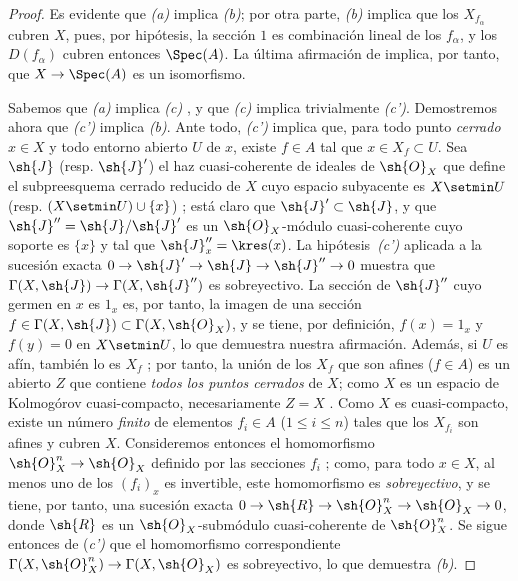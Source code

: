 \documentclass[oneside,10pt]{amsart}
\makeatletter
\renewcommand{\leq}{\leqslant}
\newcommand{\ega@arrow}[2]{\mathchoice{#1}{#2}{#2}{#2}}
\renewcommand{\to}{\ega@arrow{\longrightarrow}{\rightarrow}}
\newcommand{\oldpage}[2][]{\marginnote{\normalfont\footnotesize\textbf{#1}~|~#2}\ignorespaces}
\makeatother
\begin{document}
\begin{proof}
Es evidente que \emph{(a)} implica \emph{(b)};
por otra parte, \emph{(b)} implica que los $X_{f_\alpha}$ cubren $X$, pues, por hipótesis, la sección $1$ es combinación lineal de los $f_\alpha$, y los $D(f_\alpha)$ cubren entonces $\Spec(A)$.
La última afirmación de  implica, por tanto, que $X\to\Spec(A)$ es un isomorfismo.

Sabemos que \emph{(a)} implica \emph{(c)} , y que \emph{(c)} implica trivialmente \emph{(c')}.
Demostremos ahora que \emph{(c')} implica \emph{(b)}.
Ante todo, \emph{(c')} implica que, para todo punto \emph{cerrado} $x\in X$ y todo entorno abierto $U$ de $x$, existe $f\in A$ tal que $x\in X_f\subset U$.
Sea $\sh{J}$ (resp. $\sh{J}'$) el haz cuasi-coherente de ideales de $\sh{O}_X$ que define el subpreesquema cerrado reducido de $X$ cuyo espacio subyacente es $X\setmin U$ (resp. $(X\setmin U)\cup\{x\}$) ;
está claro que $\sh{J}'\subset\sh{J}$, y que $\sh{J}''=\sh{J}/\sh{J}'$ es un $\sh{O}_X$-módulo cuasi-coherente cuyo soporte es $\{x\}$ y tal que $\sh{J}_x''=\kres(x)$.
La hipótesis~\emph{(c')} aplicada a la sucesión exacta $0\to\sh{J}'\to\sh{J}\to\sh{J}''\to0$ muestra que $\Gamma(X,\sh{J})\to\Gamma(X,\sh{J}'')$ es sobreyectivo.
La sección de $\sh{J}''$ cuyo germen en $x$ es $1_x$ es, por tanto, la imagen de una sección $f\in\Gamma(X,\sh{J})\subset\Gamma(X,\sh{O}_X)$, y se tiene, por definición, $f(x)=1_x$ y $f(y)=0$ en $X\setmin U$, lo que demuestra nuestra afirmación.
Además, si $U$ es afín, también lo es $X_f$ ; por tanto, la unión de los $X_f$ que son afines ($f\in A$) es un abierto $Z$ que contiene \emph{todos los puntos cerrados} de $X$;
como $X$ es un espacio de Kolmogórov cuasi-compacto, necesariamente $Z=X$ .
Como $X$ es cuasi-compacto, existe un número \emph{finito} de elementos $f_i\in A$ ($1\leq i\leq n$) tales que los $X_{f_i}$ son afines y cubren $X$.
Consideremos entonces el homomorfismo $\sh{O}_X^n\to\sh{O}_X$ definido por las secciones $f_i$ ;
como, para todo $x\in X$, al menos uno de los $(f_i)_x$ es invertible, este homomorfismo es \emph{sobreyectivo}, y se tiene, por tanto, una sucesión exacta $0\to\sh{R}\to\sh{O}_X^n\to\sh{O}_X\to0$, donde $\sh{R}$ es un $\sh{O}_X$-submódulo cuasi-coherente de $\sh{O}_X^n$.
Se sigue entonces
\oldpage[II]{98}
de (\emph{c')} que el homomorfismo correspondiente $\Gamma(X,\sh{O}_X^n)\to\Gamma(X,\sh{O}_X)$ es sobreyectivo, lo que demuestra \emph{(b)}.


\end{proof}
\end{document}
